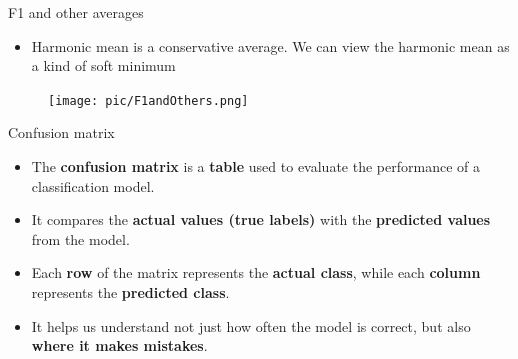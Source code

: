 \documentclass[serif, aspectratio=169]{beamer}
\begin{document}
\begin{frame}{F1 and other averages}
    \begin{itemize}
        \item Harmonic mean is a conservative average. We can view the harmonic mean as a kind of soft minimum
    \end{itemize}
    
    \begin{figure}[h]
            \centering
            
            \texttt{[image: pic/F1andOthers.png]}
            \end{figure}
    
    \vfill 
    
\end{frame}
            

\begin{frame}{Confusion matrix}
    \begin{itemize}
        \item The \textbf{confusion matrix} is a \textbf{table} used to evaluate the performance of a classification model.
        \item It compares the \textbf{actual values (true labels)} with the \textbf{predicted values} from the model.
        \item Each \textbf{row} of the matrix represents the \textbf{actual class}, while each \textbf{column} represents the \textbf{predicted class}.
        \item It helps us understand not just how often the model is correct, but also \textbf{where it makes mistakes}.
    \end{itemize}
    
\end{frame}
\end{document}
